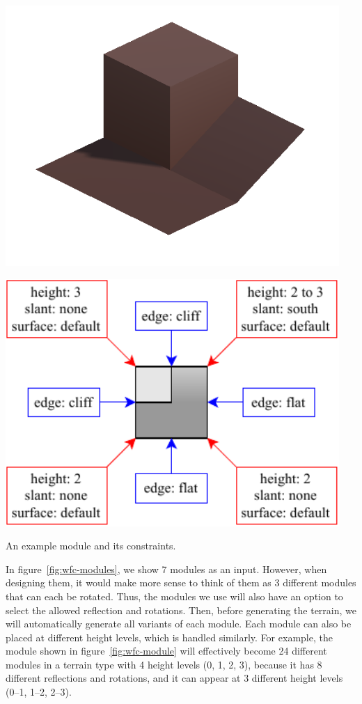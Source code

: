 \begin{center}
    \captionsetup{type=figure}
    \begin{minipage}{.5\textwidth}
        \centering
        \includegraphics[width=0.95\textwidth]{img/Module model.png}
    \end{minipage}%
    \begin{minipage}{.5\textwidth}
        \centering
        \includegraphics[width=0.95\textwidth]{img/Module constraints.pdf}
    \end{minipage}
    \caption{An example module and its constraints.}
    \label{fig:wfc-module}
\end{center}

In figure~\ref{fig:wfc-modules}, we show 7 modules as an input.
However, when designing them, it would make more sense to think of them as 3 different modules that can each be rotated.
Thus, the modules we use will also have an option to select the allowed reflection and rotations.
Then, before generating the terrain, we will automatically generate all variants of each module.
Each module can also be placed at different height levels, which is handled similarly.
For example, the module shown in figure~\ref{fig:wfc-module} will effectively become 24 different modules in a terrain type with 4 height levels (0, 1, 2, 3), because it has 8 different reflections and rotations, and it can appear at 3 different height levels (0--1, 1--2, 2--3).

